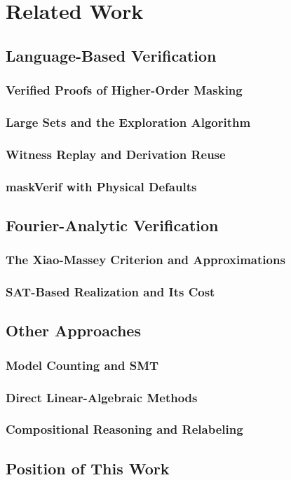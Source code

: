 \setlength{\parindent}{0pt}
\chapter{Related Work}
\section{Language-Based Verification} %
  \subsection{Verified Proofs of Higher-Order Masking}
  \subsection{Large Sets and the Exploration Algorithm}
  \subsection{Witness Replay and Derivation Reuse}
  \subsection{maskVerif with Physical Defaults}
\section{Fourier-Analytic Verification} %
\label{sec:fourier-analytic}
  \subsection{The Xiao-Massey Criterion and Approximations}
  \subsection{SAT-Based Realization and Its Cost}
\section{Other Approaches}
  \subsection{Model Counting and SMT}
  \subsection{Direct Linear-Algebraic Methods}
  \subsection{Compositional Reasoning and Relabeling}
\section{Position of This Work}
